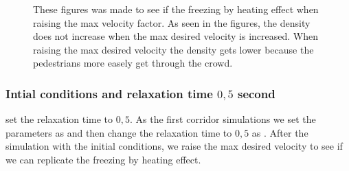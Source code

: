 \begin{figure}[h]
\centering
{}
\caption{These figures was made to see if the freezing by heating effect when raising the max velocity factor. As seen in the figures, the
density does not increase when the max desired velocity is increased. When raising the max desired velocity the density gets lower because
the pedestrians more easely get through the crowd.}
\label{fig:freezingbyheating1}
\end{figure}

\subsubsection{Intial conditions and relaxation time $0,5$ second}
\cite{helbing00} set the relaxation time to $0,5$. As the first corridor simulations we set the parameters as \cite{ABconstant}
and then change the relaxation time to $0,5$ as \cite{helbing00}. After the simulation with the initial conditions, we raise the
max desired velocity to see if we can replicate the freezing by heating effect.

